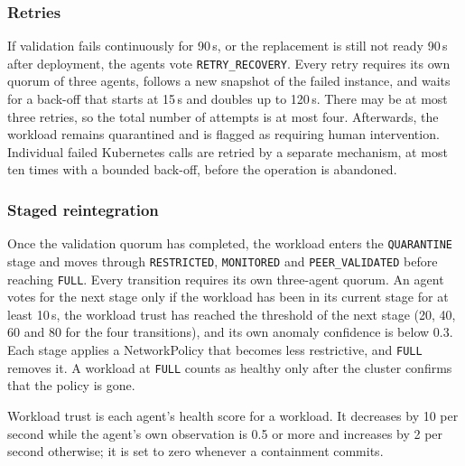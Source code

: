 \documentclass[journal]{IEEEtran}
\newcommand{\stage}[1]{\texttt{#1}}
\newcommand{\action}[1]{\texttt{#1}}
\begin{document}
\subsubsection{Retries}
If validation fails continuously for 90\,s, or the replacement is still not ready 90\,s after deployment, the agents vote \action{RETRY\_RECOVERY}. Every retry requires its own quorum of three agents, follows a new snapshot of the failed instance, and waits for a back-off that starts at 15\,s and doubles up to 120\,s. There may be at most three retries, so the total number of attempts is at most four. Afterwards, the workload remains quarantined and is flagged as requiring human intervention. Individual failed Kubernetes calls are retried by a separate mechanism, at most ten times with a bounded back-off, before the operation is abandoned.

\subsubsection{Staged reintegration}
Once the validation quorum has completed, the workload enters the \stage{QUARANTINE} stage and moves through \stage{RESTRICTED}, \stage{MONITORED} and \stage{PEER\_VALIDATED} before reaching \stage{FULL}. Every transition requires its own three-agent quorum. An agent votes for the next stage only if the workload has been in its current stage for at least 10\,s, the workload trust has reached the threshold of the next stage (20, 40, 60 and 80 for the four transitions), and its own anomaly confidence is below 0.3. Each stage applies a NetworkPolicy that becomes less restrictive, and \stage{FULL} removes it. A workload at \stage{FULL} counts as healthy only after the cluster confirms that the policy is gone.

Workload trust is each agent's health score for a workload. It decreases by 10 per second while the agent's own observation is 0.5 or more and increases by 2 per second otherwise; it is set to zero whenever a containment commits.
\end{document}
